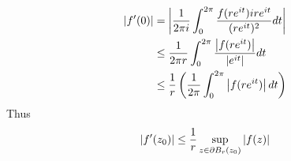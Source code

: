 \documentclass{homework}
\begin{document}
\begin{solution}
\begin{align*}
                                                                                                                                                                                                                                                   \left|f'(0)\right| &= \left|\frac{1}{2\pi i}\int_0^{2\pi} \frac{f(re^{it})ire^{it}}{(re^{it})^2}dt\right|\\
                                                                                                                                                                                                                                                   &\leq \frac{1}{2\pi r}\int_0^{2\pi} \frac{\left|f(re^{it})\right|}{\left|e^{it}\right|} dt\\
                                                                                                                                                                                                                                                   &\leq \frac{1}{r}\left(\frac{1}{2\pi}\int_0^{2\pi} \left|f(re^{it})\right| dt\right)
                                                                                                                                                                                                                                                   \end{align*}
                                                                                                                                                                                                                                                   Thus 
                                                                                                                                                                                                                                                   \begin{align}\label{derivative-dies-holomorphic}
                                                                                                                                                                                                                                                   \left|f'(z_0)\right| \leq \frac{1}{r}\displaystyle\sup_{z \in \partial B_r(z_0)} |f(z)|
                                                                                                                                                                                                                                                   \end{align}
                                                                                                                                                                                                                                                    \end{solution}
\end{document}
